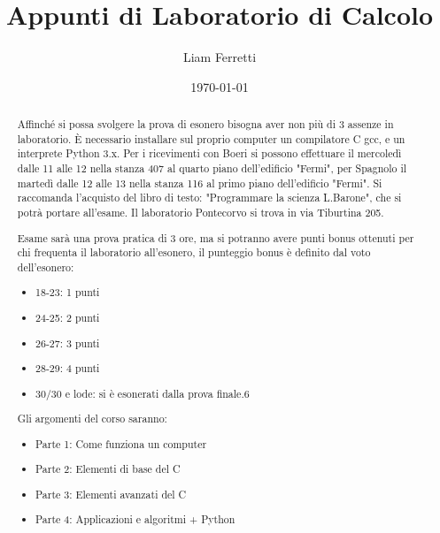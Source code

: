 \documentclass[a4paper,12pt]{article}
\title{Appunti di Laboratorio di Calcolo}
\author{Liam Ferretti}
\date{\today}
\begin{document}
	
	\maketitle
	
	\begin{abstract}
		Affinché si possa svolgere la prova di esonero bisogna aver non più di 3 assenze in laboratorio.
		È necessario installare sul proprio computer un compilatore C gcc, e un interprete Python 3.x.
		Per i ricevimenti con Boeri si possono effettuare il mercoledì dalle 11 alle 12 nella stanza 407 al quarto piano dell'edificio "Fermi", per Spagnolo il martedì dalle 12 alle 13 nella stanza 116 al primo piano dell'edificio "Fermi".
		Si raccomanda l'acquisto del libro di testo: "Programmare la scienza L.Barone", che si potrà portare all'esame.
		Il laboratorio Pontecorvo si trova in via Tiburtina 205.
		
		Esame sarà una prova pratica di 3 ore, ma si potranno avere punti bonus ottenuti per chi frequenta il laboratorio all'esonero, il punteggio bonus è definito dal voto dell'esonero:
		\begin{itemize}
			\item 18-23: 1 punti
			\item 24-25: 2 punti
			\item 26-27: 3 punti
			\item 28-29: 4 punti
			\item 30/30 e lode: si è esonerati dalla prova finale.6
		\end{itemize}
		Gli argomenti del corso saranno:
		\begin{itemize}
			\item Parte 1: Come funziona un computer
			\item Parte 2: Elementi di base del C
			\item Parte 3: Elementi avanzati del C
			\item Parte 4: Applicazioni e algoritmi + Python
		\end{itemize}
	\end{abstract}
	
	\newpage
	\tableofcontents
	\clearpage
		
\end{document}
